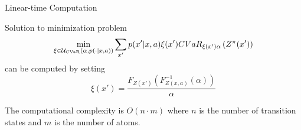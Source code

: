 \documentclass{beamer}
\begin{document}
%
%
%
%




\begin{frame}{Linear-time Computation}

\begin{theorem}
Solution to minimization problem 
$$\min_{\xi \in \mathcal{U}_{\text{CVaR}}(\alpha, p(\cdot | x, a))} \sum_{x'} p(x'| x, a)\xi(x') CVaR_{\xi(x')\alpha}\left( {Z^\pi(x')} \right)$$
can be computed by setting
$$\xi ( x' ) = \dfrac{F_{Z(x')}(F^{-1}_{Z(x,a)}(\alpha))}{\alpha} $$
\end{theorem}

The computational complexity is $O(n\cdot m)$ where $n$ is the number of transition states and $m$ is the number of atoms.

\end{frame}

\end{document}
